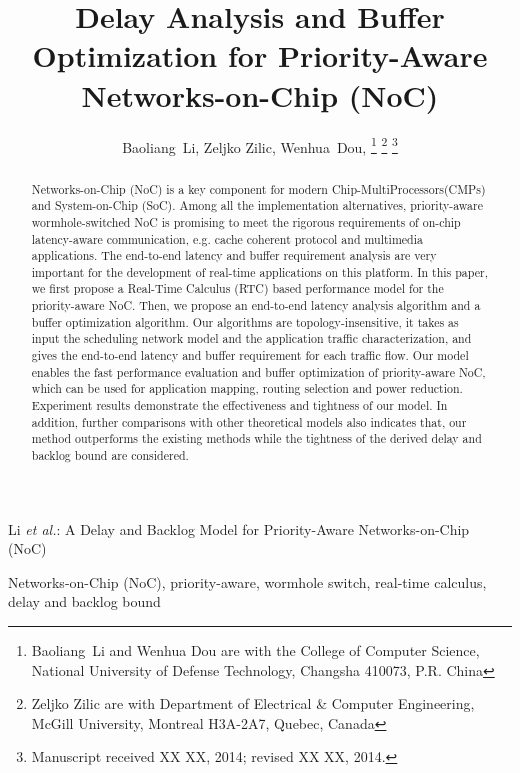 \documentclass[10pt,journal]{IEEEtran}
\begin{document}
\title{Delay Analysis and Buffer Optimization for Priority-Aware Networks-on-Chip (NoC)}

\author{Baoliang~Li, %
        Zeljko Zilic, %
        Wenhua~Dou, %
\thanks{Baoliang~Li and Wenhua Dou are with the College of Computer Science, National University of Defense Technology, Changsha 410073, P.R. China}%
\thanks{Zeljko Zilic are with Department of Electrical \& Computer Engineering, McGill University, Montreal H3A-2A7, Quebec, Canada}%
\thanks{Manuscript received XX XX, 2014; revised XX XX, 2014.}}

%
{Li \MakeLowercase{\textit{et al.}}: A Delay and Backlog Model for Priority-Aware Networks-on-Chip (NoC)}

\maketitle

\begin{abstract}
Networks-on-Chip (NoC) is a key component for modern Chip-MultiProcessors(CMPs) and System-on-Chip (SoC). Among all the implementation alternatives, priority-aware wormhole-switched NoC is promising to meet the rigorous requirements of on-chip latency-aware communication, e.g. cache coherent protocol and multimedia applications. The end-to-end latency and buffer requirement analysis are very important for the development of real-time applications on this platform. In this paper, we first propose a Real-Time Calculus (RTC) based performance model for the priority-aware NoC. Then, we propose an end-to-end latency analysis algorithm and a buffer optimization algorithm. Our algorithms are topology-insensitive, it takes as input the scheduling network model and the application traffic characterization, and gives the end-to-end latency and buffer requirement for each traffic flow. Our model enables the fast performance evaluation and buffer optimization of priority-aware NoC, which can be used for application mapping, routing selection and power reduction. Experiment results demonstrate the effectiveness and tightness of our model. In addition, further comparisons with other theoretical models also indicates that, our method outperforms the existing methods while the tightness of the derived delay and backlog bound are considered.
\end{abstract}
\begin{IEEEkeywords}
Networks-on-Chip (NoC), priority-aware, wormhole switch, real-time calculus, delay and backlog bound
\end{IEEEkeywords}
\end{document}
